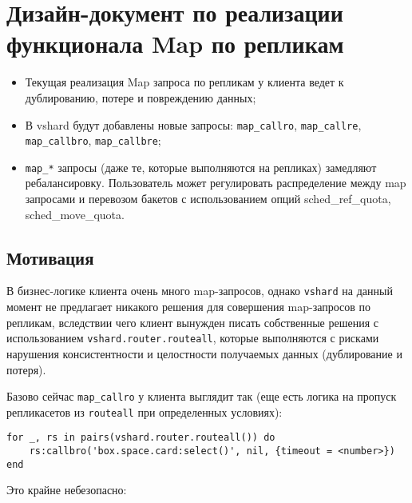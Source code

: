 \section{Дизайн-документ по реализации функционала Map по репликам}

\begin{itemize}
    \item Текущая реализация Map запроса по репликам у клиента ведет к
    дублированию, потере и повреждению данных;
    \item В vshard будут добавлены новые запросы: \texttt{map\_callro},
        \texttt{map\_callre}, \texttt{map\_callbro}, \texttt{map\_callbre};
    \item \texttt{map\_*} запросы (даже те, которые выполняются на репликах)
        замедляют ребалансировку. Пользователь может регулировать распределение
        между map запросами и перевозом бакетов с использованием опций
        sched\_ref\_quota, sched\_move\_quota.
\end{itemize}

\subsection{Мотивация}

В бизнес-логике клиента очень много map-запросов, однако \texttt{vshard} на
данный момент не предлагает никакого решения для совершения map-запросов по
репликам, вследствии чего клиент вынужден писать собственные решения с
использованием \texttt{vshard.router.routeall}, которые выполняются с рисками
нарушения консистентности и целостности получаемых данных (дублирование и
потеря).

Базово сейчас \texttt{map\_callro} у клиента выглядит так (еще есть логика на
пропуск репликасетов из \texttt{routeall} при определенных условиях):

\begin{verbatim}
for _, rs in pairs(vshard.router.routeall()) do
    rs:callbro('box.space.card:select()', nil, {timeout = <number>})
end
\end{verbatim}

Это крайне небезопасно:


